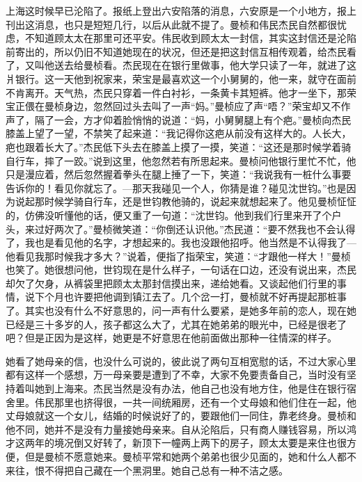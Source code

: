 \par 上海这时候早已沦陷了。报纸上登出六安陷落的消息，六安原是一个小地方，报上刊出这消息，也只是短短几行，以后从此就不提了。曼桢和伟民杰民自然都很忧虑，不知道顾太太在那里可还平安。伟民收到顾太太一封信，其实这封信还是沦陷前寄出的，所以仍旧不知道她现在的状况，但还是把这封信互相传观着，给杰民看了，又叫他送去给曼桢看。杰民现在在银行里做事，他大学只读了一年，就进了这爿银行。这一天他到祝家来，荣宝是最喜欢这一个小舅舅的，他一来，就守在面前不肯离开。天气热，杰民只穿着一件白衬衫，一条黄卡其短裤。他才一坐下，那荣宝正偎在曼桢身边，忽然回过头去叫了一声“妈。”曼桢应了声“唔？”荣宝却又不作声了，隔了一会，方才仰着脸悄悄的说道：“妈，小舅舅腿上有个疤。”曼桢向杰民膝盖上望了一望，不禁笑了起来道：“我记得你这疤从前没有这样大的。人长大，疤也跟着长大了。”杰民低下头去在膝盖上摸了一摸，笑道：“这还是那时候学着骑自行车，摔了一跤。”说到这里，他忽然若有所思起来。曼桢问他银行里忙不忙，他只是漫应着，然后忽然握着拳头在腿上捶了一下，笑道：“我说我有一桩什么事要告诉你的！看见你就忘了。—那天我碰见一个人，你猜是谁？碰见沈世钧。”也是因为说起那时候学骑自行车，还是世钧教他骑的，说起来就想起来了。他见曼桢怔怔的，仿佛没听懂他的话，便又重了一句道：“沈世钧。他到我们行里来开了个户头，来过好两次了。”曼桢微笑道：“你倒还认识他。”杰民道：“要不然我也不会认得了，我也是看见他的名字，才想起来的。我也没跟他招呼。他当然是不认得我了—他看见我那时候我才多大？”说着，便指了指荣宝，笑道：“才跟他一样大！”曼桢也笑了。她很想问他，世钧现在是什么样子，一句话在口边，还没有说出来，杰民却欠了欠身，从裤袋里把顾太太那封信摸出来，递给她看。又谈起他们行里的事情，说下个月也许要把他调到镇江去了。几个岔一打，曼桢就不好再提起那桩事了。其实也没有什么不好意思的，问一声有什么要紧，是她多年前的恋人，现在她已经是三十多岁的人，孩子都这么大了，尤其在她弟弟的眼光中，已经是很老了吧？但是正因为是这样，她更是不好意思在他前面做出那种一往情深的样子。
\par 她看了她母亲的信，也没什么可说的，彼此说了两句互相宽慰的话，不过大家心里都有这样一个感想，万一母亲要是遭到了不幸，大家不免要责备自己，当时没有坚持着叫她到上海来。杰民当然是没有办法，他自己也没有地方住，他是住在银行宿舍里。伟民那里也挤得很，一共一间统厢房，还有一个丈母娘和他们住在一起，他丈母娘就这一个女儿，结婚的时候说好了的，要跟他们一同住，靠老终身。曼桢和他不同，她并不是没有力量接她母亲来。自从沦陷后，只有商人赚钱容易，所以鸿才这两年的境况倒又好转了，新顶下一幢两上两下的房子，顾太太要是来住也很方便，但是曼桢不愿意她来。曼桢平常和她两个弟弟也很少见面的，她和什么人都不来往，恨不得把自己藏在一个黑洞里。她自己总有一种不洁之感。
